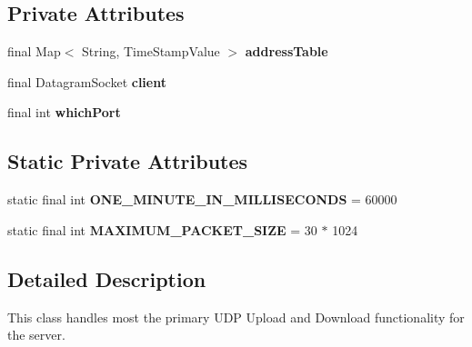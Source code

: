 \subsection*{Private Attributes}
\begin{DoxyCompactItemize}
\item 
\hypertarget{classcom_1_1server_1_1HandleUDP_a4dcb0a95b3431a88f398282ec3a499dc}{final Map$<$ String, Time\-Stamp\-Value $>$ {\bfseries address\-Table}}\label{classcom_1_1server_1_1HandleUDP_a4dcb0a95b3431a88f398282ec3a499dc}

\item 
\hypertarget{classcom_1_1server_1_1HandleUDP_ab24c8005f47ea8f5ac71320473946a6f}{final Datagram\-Socket {\bfseries client}}\label{classcom_1_1server_1_1HandleUDP_ab24c8005f47ea8f5ac71320473946a6f}

\item 
\hypertarget{classcom_1_1server_1_1HandleUDP_a34ce0e6d194601f10ea85144d57bd452}{final int {\bfseries which\-Port}}\label{classcom_1_1server_1_1HandleUDP_a34ce0e6d194601f10ea85144d57bd452}

\end{DoxyCompactItemize}
\subsection*{Static Private Attributes}
\begin{DoxyCompactItemize}
\item 
\hypertarget{classcom_1_1server_1_1HandleUDP_af20e767dcb9aebe5f9a691d4c419d885}{static final int {\bfseries O\-N\-E\-\_\-\-M\-I\-N\-U\-T\-E\-\_\-\-I\-N\-\_\-\-M\-I\-L\-L\-I\-S\-E\-C\-O\-N\-D\-S} = 60000}\label{classcom_1_1server_1_1HandleUDP_af20e767dcb9aebe5f9a691d4c419d885}

\item 
\hypertarget{classcom_1_1server_1_1HandleUDP_a0be809a15b91cf0e1218c9a9fe4083dd}{static final int {\bfseries M\-A\-X\-I\-M\-U\-M\-\_\-\-P\-A\-C\-K\-E\-T\-\_\-\-S\-I\-Z\-E} = 30 $\ast$ 1024}\label{classcom_1_1server_1_1HandleUDP_a0be809a15b91cf0e1218c9a9fe4083dd}

\end{DoxyCompactItemize}


\subsection{Detailed Description}
This class handles most the primary U\-D\-P Upload and Download functionality for the server. 

